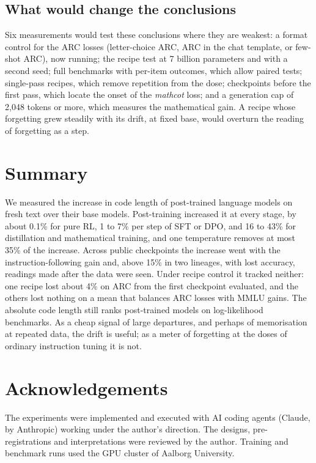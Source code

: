 \documentclass[11pt,a4paper]{article}
\theoremstyle{definition}
\newcommand{\mathcot}{\textit{mathcot}}
\begin{document}
\subsection{What would change the conclusions}

Six measurements would test these conclusions where they are weakest: a format control for the ARC losses
(letter-choice ARC, ARC in the chat template, or few-shot ARC), now running; the recipe test at 7 billion
parameters and with a second seed; full benchmarks with per-item outcomes, which allow paired tests; single-pass
recipes, which remove repetition from the dose; checkpoints before the first pass, which locate the onset of the
\mathcot{} loss; and a generation cap of 2,048 tokens or more, which measures the mathematical gain. A recipe whose
forgetting grew steadily with its drift, at fixed base, would overturn the reading of forgetting as a step.

\section{Summary}

We measured the increase in code length of post-trained language models on fresh text over their base models.
Post-training increased it at every stage, by about 0.1\% for pure RL, 1 to 7\% per step of SFT or DPO, and 16 to
43\% for distillation and mathematical training, and one temperature removes at most 35\% of the increase. Across
public checkpoints the increase went with the instruction-following gain and, above 15\% in two lineages, with lost
accuracy, readings made after the data were seen. Under recipe control it tracked neither: one recipe lost about
4\% on ARC from the first checkpoint evaluated, and the others lost nothing on a mean that balances ARC losses with
MMLU gains. The absolute code length still ranks post-trained models on log-likelihood benchmarks. As a cheap
signal of large departures, and perhaps of memorisation at repeated data, the drift is useful; as a meter of
forgetting at the doses of ordinary instruction tuning it is not.

\section*{Acknowledgements}

The experiments were implemented and executed with AI coding agents (Claude, by Anthropic) working under the
author's direction. The designs, pre-registrations and interpretations were reviewed by the author. Training and
benchmark runs used the GPU cluster of Aalborg University.
\end{document}
